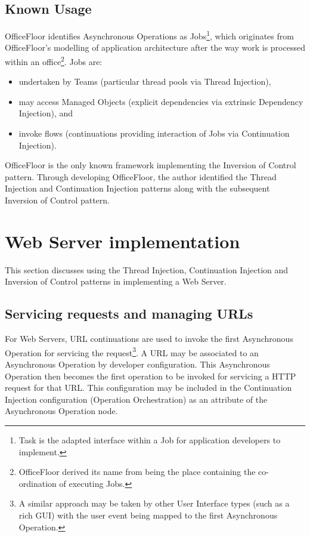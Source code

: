 \documentclass[prodmode]{style/acmlarge}
\begin{document}
\subsection{Known Usage}

OfficeFloor \cite{officefloor} identifies Asynchronous Operations as
Jobs\footnote{Task is the adapted interface within a Job for application
developers to implement.}, which originates from OfficeFloor's modelling of
application architecture after the way work is processed within an
office\footnote{OfficeFloor derived its name from being the place containing the
co-ordination of executing Jobs.}.  Jobs are:
\begin{itemize}
  \item undertaken by Teams (particular thread pools via Thread Injection),
  \item may access Managed Objects (explicit dependencies via extrinsic Dependency Injection), and
  \item invoke flows (continuations providing interaction of Jobs via Continuation Injection).
\end{itemize}

OfficeFloor is the only known framework implementing the Inversion of Control
pattern.  Through developing OfficeFloor, the author identified the Thread
Injection and Continuation Injection patterns along with the subsequent
Inversion of Control pattern.



\section{Web Server implementation}

This section discusses using the Thread Injection, Continuation Injection and
Inversion of Control patterns in implementing a Web Server.


\subsection{Servicing requests and managing URLs}

For Web Servers, URL continuations \cite{url-continuation} are used to invoke
the first Asynchronous Operation for servicing the request\footnote{A similar
approach may be taken by other User Interface types (such as a rich GUI) with
the user event being mapped to the first Asynchronous Operation.}.  A URL may be
associated to an Asynchronous Operation by developer configuration.  This
Asynchronous Operation then becomes the first operation to be invoked for
servicing a HTTP request for that URL.  This configuration may be included in
the Continuation Injection configuration (Operation Orchestration) as an
attribute of the Asynchronous Operation node.
\end{document}
